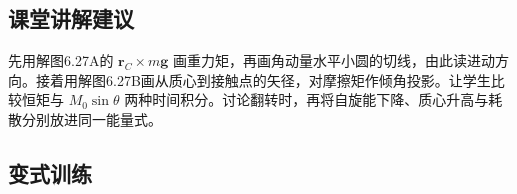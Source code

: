 \documentclass[UTF8,fontset=fandol,a4paper,11pt]{ctexart}
\begin{document}


\subsection*{课堂讲解建议}

先用解图6.27A的 $\boldsymbol r_C\times m\boldsymbol g$ 画重力矩，再画角动量水平小圆的切线，由此读进动方向。接着用解图6.27B画从质心到接触点的矢径，对摩擦矩作倾角投影。让学生比较恒矩与 $M_0\sin\theta$ 两种时间积分。讨论翻转时，再将自旋能下降、质心升高与耗散分别放进同一能量式。




\subsection*{变式训练}
\end{document}
